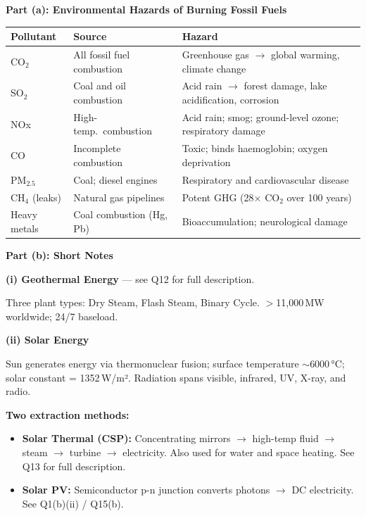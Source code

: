 \documentclass[12pt,a3paper]{article}
\begin{document}
\begin{enumerate}
\begin{tcolorbox}[enhanced,breakable,ansbox,colback=cA!4,colframe=cA,
  boxrule=0.8pt,arc=5pt,
  title={\textbf{Answer}},fonttitle=\bfseries\color{white},colbacktitle=cA]

\textbf{Part (a): Environmental Hazards of Burning Fossil Fuels}

\begin{center}
\small
\begin{tabular}{@{}p{2.5cm}p{4.5cm}p{6.5cm}@{}}
\toprule
\textbf{Pollutant} & \textbf{Source} & \textbf{Hazard} \\
\midrule
CO$_2$           & All fossil fuel combustion     & Greenhouse gas $\to$ global warming, climate change \\[3pt]
SO$_2$           & Coal and oil combustion        & Acid rain $\to$ forest damage, lake acidification, corrosion \\[3pt]
NOx              & High-temp.\ combustion         & Acid rain; smog; ground-level ozone; respiratory damage \\[3pt]
CO               & Incomplete combustion          & Toxic; binds haemoglobin; oxygen deprivation \\[3pt]
PM$_{2.5}$       & Coal; diesel engines           & Respiratory and cardiovascular disease \\[3pt]
CH$_4$ (leaks)   & Natural gas pipelines          & Potent GHG (28$\times$ CO$_2$ over 100 years) \\[3pt]
Heavy metals     & Coal combustion (Hg, Pb)       & Bioaccumulation; neurological damage \\
\bottomrule
\end{tabular}
\end{center}

\hrulefill

\textbf{Part (b): Short Notes}

\textbf{(i) Geothermal Energy} — see Q12 for full description.

Three plant types: Dry Steam, Flash Steam, Binary Cycle. $>$11,000\,MW worldwide; 24/7 baseload.

\medskip
\textbf{(ii) Solar Energy}

Sun generates energy via thermonuclear fusion; surface temperature $\sim$6000\,°C; solar constant = 1352\,W/m². Radiation spans visible, infrared, UV, X-ray, and radio.

\textbf{Two extraction methods:}
\begin{itemize}[leftmargin=1.5em,itemsep=2pt]
  \item \textbf{Solar Thermal (CSP):} Concentrating mirrors $\to$ high-temp fluid $\to$ steam $\to$ turbine $\to$ electricity. Also used for water and space heating. See Q13 for full description.
  \item \textbf{Solar PV:} Semiconductor p-n junction converts photons $\to$ DC electricity. See Q1(b)(ii) / Q15(b).
\end{itemize}


\end{tcolorbox}
\end{enumerate}
\end{document}
